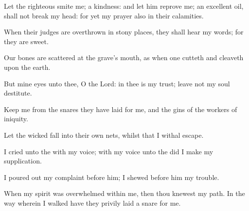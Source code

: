 {\Q {}Let the
righteous
smite me;
{} a
kindness: and let him
reprove me;
{} an
excellent
oil,
{} shall not
break my
head: for yet my
prayer also
{} in their
calamities.


\par }{\Q {}When their
judges are
overthrown in
stony
places, they shall
hear my
words; for they are
sweet.


\par }{\Q {}Our
bones are
scattered at the
grave’s
mouth, as when one
cutteth and
cleaveth
{} upon the
earth.


\par }{\Q {}But mine
eyes
{} unto thee, O
{} the
Lord: in thee is my
trust;
leave not my
soul
destitute.


\par }{\Q {}Keep me from the
snares
{} they have
laid for me, and the
gins of the
workers of
iniquity.


\par }{\Q {}Let the
wicked
fall into their own
nets, whilst that I
withal
escape.




\par }
{\Q {}I
cried unto the
{} with my
voice; with my
voice unto the
{} did I make my
supplication.


\par }{\Q {}I poured
out my
complaint
before him; I
shewed
before him my
trouble.


\par }{\Q {}When my
spirit was
overwhelmed within me, then thou
knewest my
path. In the
way
wherein I
walked have they privily
laid a
snare for me.


\par }{\BB \par }
